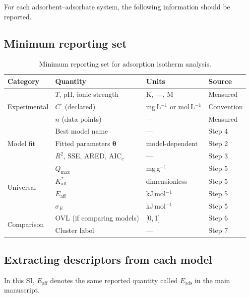 \documentclass[journal=aamick,manuscript=article]{achemso}
\begin{document}
For each adsorbent--adsorbate system, the following information
should be reported.

\subsection{Minimum reporting set}
\label{sec:si_reporting}

\begin{table}[H]
	\centering
	\small
	\caption{Minimum reporting set for adsorption isotherm analysis.}
	\label{tab:si_reporting}
	\renewcommand{\arraystretch}{1.3}
	\begin{tabular}{@{} l l l l @{}}
		\toprule
		\textbf{Category} & \textbf{Quantity} & \textbf{Units}
		& \textbf{Source} \\
		\midrule
		\multirow{3}{*}{Experimental}
		& $T$, pH, ionic strength & K, ---, M & Measured \\
		& $C^\circ$ (declared) & mg\,L$^{-1}$ or mol\,L$^{-1}$ & Convention \\
		& $n$ (data points) & --- & Measured \\
		\midrule
		\multirow{3}{*}{Model fit}
		& Best model name & --- & Step 4 \\
		& Fitted parameters $\boldsymbol{\theta}$ & model-dependent & Step 2 \\
		& $R^2$, SSE, ARED, AIC$_c$ & --- & Step 3 \\
		\midrule
		\multirow{4}{*}{Universal}
		& $Q_{\max}$ & mg\,g$^{-1}$ & Step 5 \\
		& $K_{\mathrm{aff}}^{\ast}$ & dimensionless & Step 5 \\
		& $E_{\mathrm{aff}}$ & kJ\,mol$^{-1}$ & Step 5 \\
		& $\sigma_E$ & kJ\,mol$^{-1}$ & Step 5 \\
		\midrule
		\multirow{2}{*}{Comparison}
		& OVL (if comparing models) & [0,\,1] & Step 6 \\
		& Cluster label & --- & Step 7 \\
		\bottomrule
	\end{tabular}
\end{table}

\subsection{Extracting descriptors from each model}
\label{sec:si_extraction}

\noindent In this SI, $E_{\mathrm{aff}}$ denotes the same reported
quantity called $E_{\mathrm{ads}}$ in the main manuscript.
\end{document}
